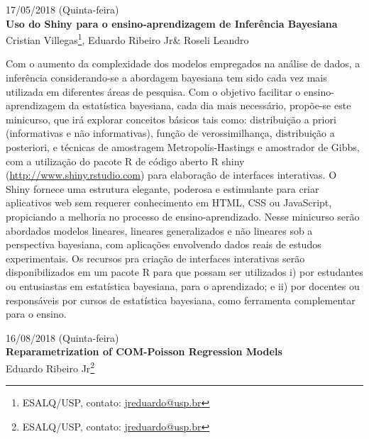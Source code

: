 \documentclass[9pt, a5paper]{article}
\begin{document}

\begin{center}
  {\footnotesize 17/05/2018 (Quinta-feira)}\\
  \textbf{\large
    Uso do Shiny para o ensino-aprendizagem de
    Inferência Bayesiana}\\
  Cristian Villegas\footnote{ESALQ/USP, contato:
    \url{jreduardo@usp.br}},
  Eduardo Ribeiro Jr\footnotemark[1] \&
  Roseli Leandro\footnotemark[1]
\end{center}

 Com o aumento da complexidade dos modelos empregados na análise de
 dados, a inferência considerando-se a abordagem bayesiana tem sido cada
 vez mais utilizada em diferentes áreas de pesquisa. Com o objetivo
 facilitar o ensino-aprendizagem da estatística bayesiana, cada dia mais
 necessário, propõe-se este minicurso, que irá explorar conceitos
 básicos tais como: distribuição a priori (informativas e não
 informativas), função de verossimilhança, distribuição a posteriori, e
 técnicas de amostragem Metropolis-Hastings e amostrador de Gibbs, com a
 utilização do pacote R de código aberto R shiny
 (\url{http://www.shiny.rstudio.com}) para elaboração de interfaces
 interativas. O Shiny fornece uma estrutura elegante, poderosa e
 estimulante para criar aplicativos web sem requerer conhecimento em
 HTML, CSS ou JavaScript, propiciando a melhoria no processo de
 ensino-aprendizado. Nesse minicurso serão abordados modelos lineares,
 lineares generalizados e não lineares sob a perspectiva bayesiana, com
 aplicações envolvendo dados reais de estudos experimentais. Os recursos
 pra criação de interfaces interativas serão disponibilizados em um
 pacote R para que possam ser utilizados i) por estudantes ou
 entusiastas em estatística bayesiana, para o aprendizado; e ii) por
 docentes ou responsáveis por cursos de estatística bayesiana, como
 ferramenta complementar para o ensino.

\clearpage


\begin{center}
  {\footnotesize 16/08/2018 (Quinta-feira)}\\
  \textbf{\large
    Reparametrization of COM-Poisson Regression Models}\\
  Eduardo Ribeiro Jr\footnote{ESALQ/USP, contato:
    \url{jreduardo@usp.br}}
\end{center}
\end{document}
